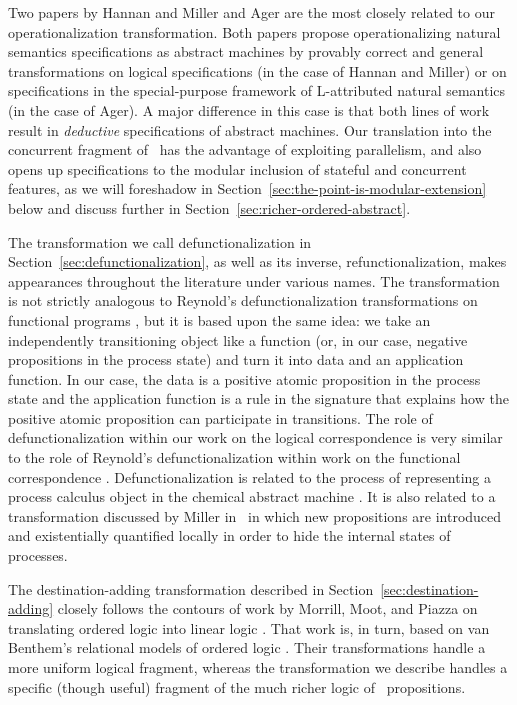 Two papers by Hannan and Miller \cite{hannan92operational} and Ager
\cite{ager04natural} are the most closely related to our
operationalization transformation. Both papers propose
operationalizing natural semantics specifications as abstract machines
by provably correct and general transformations on logical
specifications (in the case of Hannan and Miller) or on specifications
in the special-purpose framework of L-attributed natural semantics (in
the case of Ager).  A major difference in this case is that both lines
of work result in {\it deductive} specifications of abstract
machines. Our translation into the concurrent fragment of \sls~has the
advantage of exploiting parallelism, and also opens up specifications
to the modular inclusion of stateful and concurrent features, as we
will foreshadow in Section~\ref{sec:the-point-is-modular-extension}
below and discuss further in
Section~\ref{sec:richer-ordered-abstract}.

The transformation we call defunctionalization in
Section~\ref{sec:defunctionalization}, as well as its inverse,
refunctionalization, makes appearances throughout the literature under
various names. The transformation is not strictly analogous to
Reynold's defunctionalization transformations on functional programs
\cite{reynolds72definitional}, but it is based upon the same idea: we
take an independently transitioning object like a function (or, in our
case, negative propositions in the process state) and turn it into
data and an application function.  In our case, the data is a positive
atomic proposition in the process state and the application function
is a rule in the signature that explains how the positive atomic
proposition can participate in transitions.  The role of
defunctionalization within our work on the logical correspondence is
very similar to the role of Reynold's defunctionalization within work
on the functional correspondence
\cite{danvy08defunctionalized}. Defunctionalization is related to the
process of representing a process calculus object in the chemical
abstract machine \cite{berry90chemical}.  It is also related to a
transformation discussed by Miller in~\cite{miller02higherorder} in
which new propositions are introduced and existentially quantified
locally in order to hide the internal states of processes.

The destination-adding transformation described in
Section~\ref{sec:destination-adding} closely follows the contours of
work by Morrill, Moot, and Piazza on translating ordered logic into
linear logic \cite{morrill95higher,moot01linguistic}. That work is, in
turn, based on van Benthem's relational models of ordered logic
\cite{vanbenthem91relational}. Their transformations handle a more
uniform logical fragment, whereas the transformation we describe
handles a specific (though useful) fragment of the much richer logic
of \sls~propositions.

